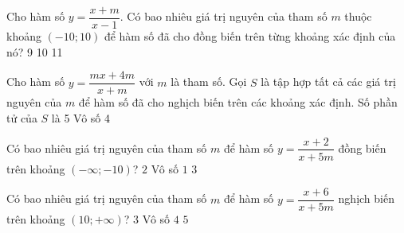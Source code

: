 \begin{ex}%
    Cho hàm số $y=\dfrac{x+m}{x-1}$. Có bao nhiêu giá trị nguyên của tham số $m$ thuộc khoảng $(-10;10)$ để hàm số đã cho đồng biến trên từng khoảng xác định của nó?
    \choice
    {}
    {9}
    {10}
    {11}
\end{ex}
\begin{ex}%
    Cho hàm số $y=\dfrac{mx+4m}{x+m}$ với $m$ là tham số. Gọi $S$ là tập hợp tất cả các giá trị nguyên của $m$ để hàm số đã cho nghịch biến trên các khoảng xác định. Số phần tử của $S$ là
    \choice
    {5}
    { Vô số}
    {4}
    {}
\end{ex}
\begin{ex}%
    Có bao nhiêu giá trị nguyên của tham số $m$ để hàm số $y=\dfrac{x+2}{x+5m}$ đồng biến trên khoảng $(-\infty;-10)$?
    \choice
    {\True $2$}
    { Vô số}
    {$1$}
    {$3$}
\end{ex}
\begin{ex}%
    Có bao nhiêu giá trị nguyên của tham số $m$ để hàm số $y=\dfrac{x+6}{x+5m}$ nghịch biến trên khoảng $(10;+\infty)$?
    \choice
    {$3$}
    {Vô số}
    {\True $4$}
    {$5$}
\end{ex}
